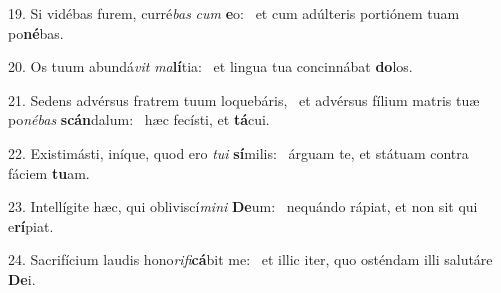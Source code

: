 19. Si vidébas furem, curré\textit{bas} \textit{cum} \textbf{e}o: \ast\  et cum adúlteris portiónem tuam po\textbf{né}bas.\

20. Os tuum abundá\textit{vit} \textit{ma}\textbf{lí}tia: \ast\  et lingua tua concinnábat \textbf{do}los.\

21. Sedens advérsus fratrem tuum loquebáris, \dag\  et advérsus fílium matris tuæ po\textit{né}\textit{bas} \textbf{scán}dalum: \ast\  hæc fecísti, et \textbf{tá}cui.\

22. Existimásti, iníque, quod ero \textit{tu}\textit{i} \textbf{sí}milis: \ast\  árguam te, et státuam contra fáciem \textbf{tu}am.\

23. Intellígite hæc, qui obliviscí\textit{mi}\textit{ni} \textbf{De}um: \ast\  nequándo rápiat, et non sit qui e\textbf{rí}piat.\

24. Sacrifícium laudis hono\textit{ri}\textit{fi}\textbf{cá}bit me: \ast\  et illic iter, quo osténdam illi salutáre \textbf{De}i.\

